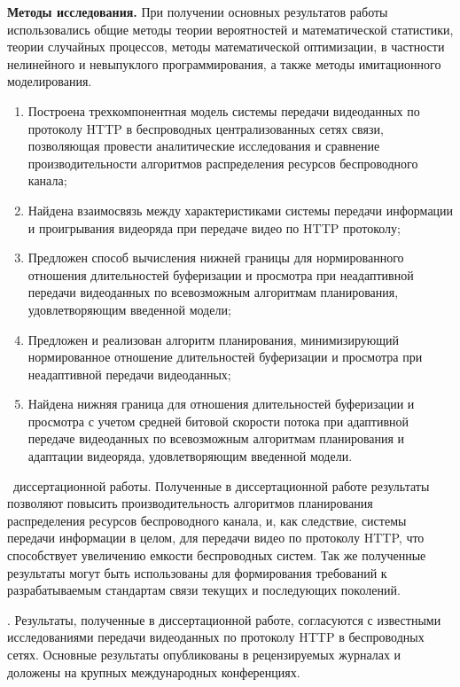 \textbf{Методы исследования.} При получении основных результатов работы использовались общие методы теории вероятностей и математической статистики, теории случайных процессов, методы математической оптимизации, в частности нелинейного и невыпуклого программирования, а также методы имитационного моделирования.

\novelty
\begin{enumerate}
    \item Построена трехкомпонентная модель системы передачи видеоданных по протоколу HTTP в беспроводных централизованных сетях связи, позволяющая провести аналитические исследования и сравнение производительности алгоритмов распределения ресурсов беспроводного канала;
    \item Найдена взаимосвязь между характеристиками системы передачи информации и проигрывания видеоряда при передаче видео по HTTP протоколу;
    \item Предложен способ вычисления нижней границы для нормированного отношения длительностей буферизации и просмотра при неадаптивной передачи видеоданных по всевозможным алгоритмам планирования, удовлетворяющим введенной модели;
    \item Предложен и реализован алгоритм планирования, минимизирующий нормированное отношение длительностей буферизации и просмотра при неадаптивной передачи видеоданных;
    \item Найдена нижняя граница для отношения длительностей буферизации и просмотра с учетом средней битовой скорости потока при адаптивной передаче видеоданных по всевозможным алгоритмам планирования и адаптации видеоряда, удовлетворяющим введенной модели.
\end{enumerate}

\influence\ диссертационной работы. Полученные в диссертационной работе результаты позволяют повысить производительность алгоритмов планирования распределения ресурсов беспроводного канала, и, как следствие, системы передачи информации в целом, для передачи видео по протоколу HTTP, что способствует увеличению емкости беспроводных систем. Так же полученные результаты могут быть использованы для формирования требований к разрабатываемым стандартам связи текущих и последующих поколений.

\reliability. Результаты, полученные в диссертационной работе, согласуются с известными исследованиями передачи видеоданных по протоколу HTTP в беспроводных сетях. Основные результаты опубликованы в рецензируемых журналах и доложены на крупных международных конференциях.

